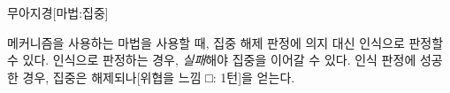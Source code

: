 \documentclass{report}
\begin{document}
	\begin{story}{무아지경}{[마법:집중]}
		
		 메커니즘을 사용하는 마법을 사용할 때, 집중 해제 판정에 의지 대신 인식으로 판정할 수 있다. 인식으로 판정하는 경우, \emph{실패}해야 집중을 이어갈 수 있다. 인식 판정에 성공한 경우, 집중은 해제되나[위협을 느낌 □: 1턴]을 얻는다.
		
	\end{story}
\end{document}
